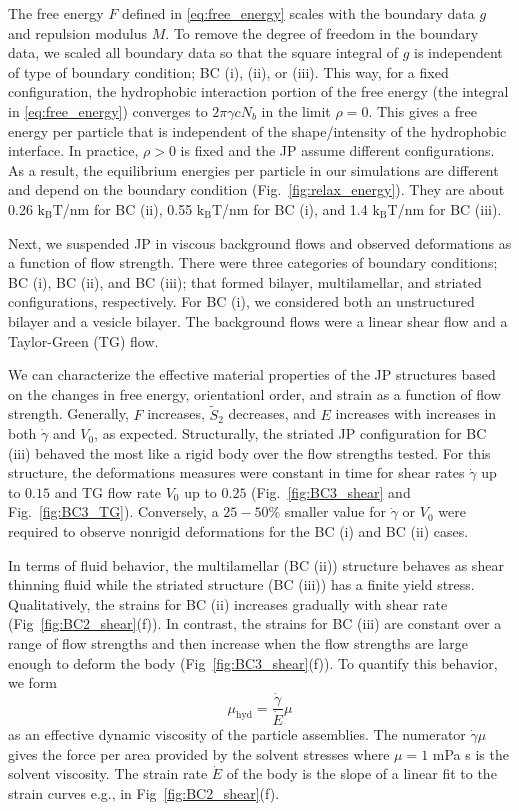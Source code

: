 \documentclass[prb,preprint,showpacs,preprintnumbers,amsmath,amssymb,longbibliography]{revtex4-1}
\begin{document}
The free energy $F$ defined in \eqref{eq:free_energy}
scales with the boundary data $g$ and repulsion modulus $M$.
To remove the degree of freedom in the boundary data,
we scaled all boundary data so that the square integral of $g$ is independent of
type of boundary condition; BC (i), (ii), or (iii).
This way, for a fixed configuration, the hydrophobic interaction portion of the
free energy (the integral in \eqref{eq:free_energy}) converges to $2\pi \gamma c N_b$
in the limit $\rho = 0$.  This gives a free energy per particle that is independent
of the shape/intensity of the hydrophobic interface.  In practice, $\rho > 0$ is fixed
and the JP assume different configurations.  As a result, the equilibrium energies
per particle in our simulations are different and depend on the boundary condition
(Fig.~\ref{fig:relax_energy}).
They are about 0.26 $\mathrm{k_BT}$/nm for BC (ii),
0.55 $\mathrm{k_BT}$/nm for BC (i), and
1.4 $\mathrm{k_BT}$/nm for BC (iii).


Next, we suspended JP in viscous background flows and observed deformations
as a function of flow strength.  There were three categories of boundary
conditions; BC (i), BC (ii), and BC (iii); that formed bilayer, multilamellar, and striated
configurations, respectively. For BC (i), we considered both an unstructured bilayer
and a vesicle bilayer.  The background flows were a linear shear flow and a Taylor-Green (TG) flow.

We can characterize the effective material properties of the JP structures
based on the changes in free energy, orientationl order, and strain as a function
of flow strength.
Generally, $F$ increases, $\tilde S_2$ decreases, and 
$E$ increases with increases in both $\dot \gamma$ and $V_0$, as expected.
Structurally, the striated JP configuration for BC (iii) behaved the most
like a rigid body over the flow strengths tested.  For this structure,
the deformations measures were constant in time for shear rates $\dot \gamma$ up to
$0.15$ and TG flow rate $V_0$ up to $0.25$
(Fig.~\ref{fig:BC3_shear} and Fig.~\ref{fig:BC3_TG}).
Conversely, a $25 - 50 \%$
smaller value for $\dot \gamma$ or $V_0$ were required to observe
nonrigid deformations for the BC (i) and BC (ii) cases.

In terms of fluid behavior,
the multilamellar (BC (ii)) structure behaves as shear thinning fluid
while the striated structure (BC (iii)) has a finite yield stress. 
Qualitatively, the strains for BC (ii) increases gradually 
with shear rate (Fig~\ref{fig:BC2_shear}(f)).
In contrast, the strains for BC (iii) are constant over a range of flow strengths
and then increase when the flow strengths are large enough
to deform the body (Fig~\ref{fig:BC3_shear}(f)).
To quantify this behavior, we form 
\[
\mu_{\text{hyd}} = \frac{\dot \gamma}{\dot E} \mu
\]
as an effective dynamic viscosity of the particle assemblies.
The numerator $\dot \gamma \mu$ gives the force per
area provided by the solvent stresses where
$\mu = 1$ mPa s is
the solvent viscosity.
The strain rate $\dot E$ of the body is the slope of a linear fit to the strain curves e.g.,
in Fig~\ref{fig:BC2_shear}(f).
\end{document}
